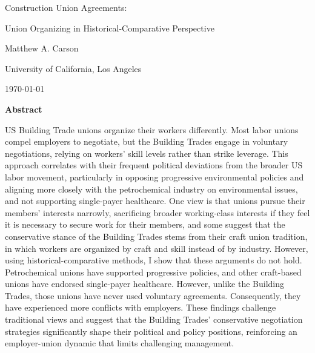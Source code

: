 \renewenvironment{quote}
  {\list{}{\leftmargin=\parindent\rightmargin=0pt}%
   \item\relax}
  {\endlist}

\renewenvironment{abstract}
  {\par\noindent\centering\textbf{Abstract}\par\noindent\raggedright}
  {\par}




\begin{titlepage}
  \thispagestyle{fancy}
  \centering
  \vspace*{1.95in}
  {\LARGE Construction Union Agreements:\par Union Organizing in Historical-Comparative Perspective\par}
  \vspace{1.2in}
  {Matthew A. Carson\par}
  \vspace{0in}
  {University of California, Los Angeles\par}
  \vspace{0.5in}
  {\today\par}
\end{titlepage}


\begin{abstract}
US Building Trade unions organize their workers differently. Most labor unions compel employers to negotiate, but the Building Trades engage in voluntary negotiations, relying on workers' skill levels rather than strike leverage. This approach correlates with their frequent political deviations from the broader US labor movement, particularly in opposing progressive environmental policies and aligning more closely with the petrochemical industry on environmental issues, and not supporting single-payer healthcare. One view is that unions pursue their members’ interests narrowly, sacrificing broader working-class interests if they feel it is necessary to secure work for their members, and some suggest that the conservative stance of the Building Trades stems from their craft union tradition, in which workers are organized by craft and skill instead of by industry. However, using historical-comparative methods, I show that these arguments do not hold. Petrochemical unions have supported progressive policies, and other craft-based unions have endorsed single-payer healthcare. However, unlike the Building Trades, those unions have never used voluntary agreements. Consequently, they have experienced more conflicts with employers. These findings challenge traditional views and suggest that the Building Trades' conservative negotiation strategies significantly shape their political and policy positions, reinforcing an employer-union dynamic that limits challenging management.
\end{abstract}
\newpage

